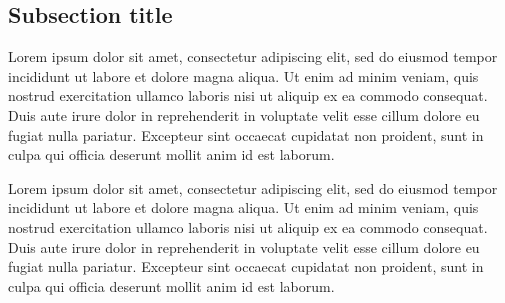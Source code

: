 \subsection{Subsection title}
Lorem ipsum dolor sit amet, consectetur adipiscing elit, sed do eiusmod tempor incididunt ut labore et dolore magna aliqua. Ut enim ad minim veniam, quis nostrud exercitation ullamco laboris nisi ut aliquip ex ea commodo consequat. Duis aute irure dolor in reprehenderit in voluptate velit esse cillum dolore eu fugiat nulla pariatur. Excepteur sint occaecat cupidatat non proident, sunt in culpa qui officia deserunt mollit anim id est laborum.

Lorem ipsum dolor sit amet, consectetur adipiscing elit, sed do eiusmod tempor incididunt ut labore et dolore magna aliqua. Ut enim ad minim veniam, quis nostrud exercitation ullamco laboris nisi ut aliquip ex ea commodo consequat. Duis aute irure dolor in reprehenderit in voluptate velit esse cillum dolore eu fugiat nulla pariatur. Excepteur sint occaecat cupidatat non proident, sunt in culpa qui officia deserunt mollit anim id est laborum.

